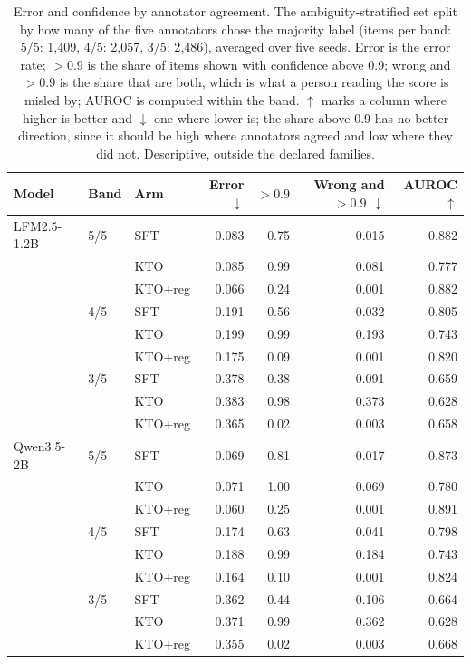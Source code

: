 \begin{table}[t]
\centering
\caption{Error and confidence by annotator agreement. The ambiguity-stratified set split by how many of the five annotators chose the majority label (items per band: 5/5: 1{,}409, 4/5: 2{,}057, 3/5: 2{,}486), averaged over five seeds. Error is the error rate; $>0.9$ is the share of items shown with confidence above 0.9; wrong and $>0.9$ is the share that are both, which is what a person reading the score is misled by; AUROC is computed within the band. $\uparrow$ marks a column where higher is better and $\downarrow$ one where lower is; the share above 0.9 has no better direction, since it should be high where annotators agreed and low where they did not. Descriptive, outside the declared families.}
\label{tab:bands}
\footnotesize
\begin{tabular}{lllrrrr}
\toprule
Model & Band & Arm & Error$\downarrow$ & $>0.9$ & Wrong and $>0.9$ $\downarrow$ & AUROC$\uparrow$ \\
\midrule
LFM2.5-1.2B & 5/5 & SFT & 0.083 & 0.75 & 0.015 & 0.882 \\
 &  & KTO & 0.085 & 0.99 & 0.081 & 0.777 \\
 &  & KTO+reg & 0.066 & 0.24 & 0.001 & 0.882 \\
 & 4/5 & SFT & 0.191 & 0.56 & 0.032 & 0.805 \\
 &  & KTO & 0.199 & 0.99 & 0.193 & 0.743 \\
 &  & KTO+reg & 0.175 & 0.09 & 0.001 & 0.820 \\
 & 3/5 & SFT & 0.378 & 0.38 & 0.091 & 0.659 \\
 &  & KTO & 0.383 & 0.98 & 0.373 & 0.628 \\
 &  & KTO+reg & 0.365 & 0.02 & 0.003 & 0.658 \\
\addlinespace
Qwen3.5-2B & 5/5 & SFT & 0.069 & 0.81 & 0.017 & 0.873 \\
 &  & KTO & 0.071 & 1.00 & 0.069 & 0.780 \\
 &  & KTO+reg & 0.060 & 0.25 & 0.001 & 0.891 \\
 & 4/5 & SFT & 0.174 & 0.63 & 0.041 & 0.798 \\
 &  & KTO & 0.188 & 0.99 & 0.184 & 0.743 \\
 &  & KTO+reg & 0.164 & 0.10 & 0.001 & 0.824 \\
 & 3/5 & SFT & 0.362 & 0.44 & 0.106 & 0.664 \\
 &  & KTO & 0.371 & 0.99 & 0.362 & 0.628 \\
 &  & KTO+reg & 0.355 & 0.02 & 0.003 & 0.668 \\

\end{tabular}
\end{table}
